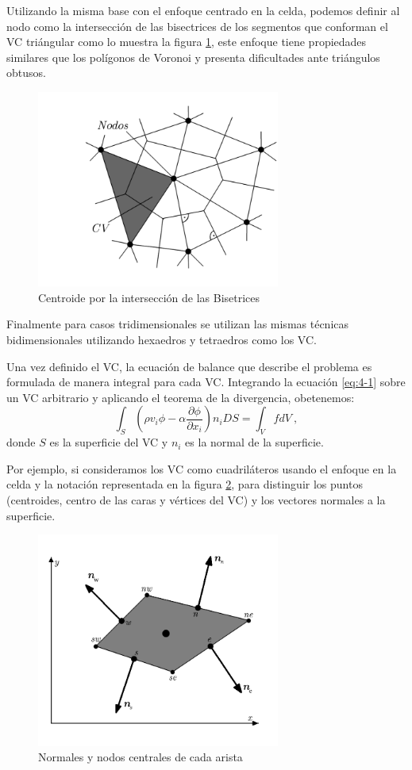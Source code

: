 \documentclass[a4paper,10pt, oneside]{book}
\begin{document}
Utilizando la misma base con el enfoque centrado en la celda, podemos definir al nodo como la intersección de las bisectrices de los segmentos que conforman el VC triángular como lo muestra la figura \ref{img:4-32}, este enfoque tiene propiedades similares que los polígonos de Voronoi y presenta dificultades ante triángulos obtusos.
\begin{figure}[h!]
	\centering
	\includegraphics[width=8cm]{Img/4-32}
	\caption{Centroide por la intersección de las Bisetrices}
	\label{img:4-32}
\end{figure}
Finalmente para casos tridimensionales se utilizan las mismas técnicas bidimensionales utilizando hexaedros y tetraedros como los VC.

Una vez definido el VC, la ecuación de balance que describe el problema es formulada de manera integral para cada VC. Integrando la ecuación \ref{eq:4-1} sobre un VC arbitrario y aplicando el teorema de la divergencia, obetenemos:
\begin{equation}
	\int_S \left( \rho v_i \phi - \alpha \frac{\partial \phi}{\partial x_i} \right)n_i DS = \int_V f dV ~,
	\label{eq:4-2}
\end{equation}
donde $S$ es la superficie del VC y $n_i$ es la normal de la superficie. 

Por ejemplo, si consideramos los VC como cuadriláteros usando el enfoque en la celda y la notación representada en la figura \ref{img:4-4}, para distinguir los puntos (centroides, centro de las caras y vértices del VC) y los vectores normales a la superficie.
\begin{figure}[h!]
	\centering
	\includegraphics[width=8cm]{Img/4-5}
	\caption{Normales y nodos centrales de cada arista}
	\label{img:4-4}
\end{figure}
\end{document}
